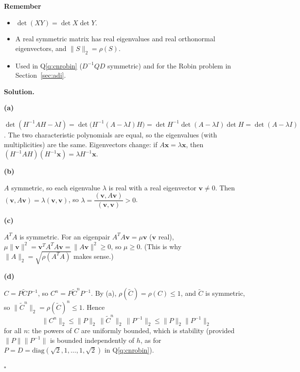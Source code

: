\documentclass[11pt,a4paper]{article}
\newenvironment{rem}
  {\begin{remember}\noindent\textbf{Remember}\par\nobreak\vspace{-0.3em}}
  {\end{remember}}
\newenvironment{solution}
  {\par\noindent\textbf{Solution.}\par\nobreak}
  {\par\nobreak\noindent\hfill\(\square\)\par}
\newcommand{\step}[1]{\par\addvspace{0.5em}\noindent\textbf{#1}\par\nobreak}
\begin{document}
\begin{rem}
\begin{itemize}
  \item \(\det(XY)=\det X\det Y\).
  \item A real symmetric matrix has real eigenvalues and real
    orthonormal eigenvectors, and \(\|S\|_2=\rho(S)\).
  \item Used in Q\ref{q:cnrobin} (\(D^{-1}QD\) symmetric) and for the
    Robin problem in Section~\ref{sec:adi}.
\end{itemize}
\end{rem}

\begin{solution}
\step{(a)}
\(\det(H^{-1}AH-\lambda I)=\det\bigl(H^{-1}(A-\lambda I)H\bigr)
=\det H^{-1}\det(A-\lambda I)\det H=\det(A-\lambda I)\).  The two
characteristic polynomials are equal, so the eigenvalues (with
multiplicities) are the same.  Eigenvectors change: if
\(A\mathbf x=\lambda\mathbf x\), then
\((H^{-1}AH)(H^{-1}\mathbf x)=\lambda H^{-1}\mathbf x\).

\step{(b)}
\(A\) symmetric, so each eigenvalue \(\lambda\) is real with a real
eigenvector \(\mathbf v\ne0\).  Then
\((\mathbf v,A\mathbf v)=\lambda(\mathbf v,\mathbf v)\), so
\(\lambda=\dfrac{(\mathbf v,A\mathbf v)}{(\mathbf v,\mathbf v)}>0\).

\step{(c)}
\(A^TA\) is symmetric.  For an eigenpair
\(A^TA\mathbf v=\mu\mathbf v\) (\(\mathbf v\) real),
\(\mu\|\mathbf v\|^2=\mathbf v^TA^TA\mathbf v=\|A\mathbf v\|^2\ge0\), so
\(\mu\ge0\).  (This is why \(\|A\|_2=\sqrt{\rho(A^TA)}\) makes sense.)

\step{(d)}
\(C=P\widetilde CP^{-1}\), so \(C^n=P\widetilde C^nP^{-1}\).  By (a),
\(\rho(\widetilde C)=\rho(C)\le1\), and \(\widetilde C\) is symmetric, so
\(\|\widetilde C^n\|_2=\rho(\widetilde C)^n\le1\).  Hence
\[
  \|C^n\|_2\le\|P\|_2\,\|\widetilde C^n\|_2\,\|P^{-1}\|_2\le\|P\|_2\|P^{-1}\|_2
\]
for all \(n\): the powers of \(C\) are uniformly bounded, which is
stability (provided \(\|P\|\|P^{-1}\|\) is bounded independently of
\(h\), as for \(P=D=\mathrm{diag}(\sqrt2,1,\dots,1,\sqrt2)\) in
Q\ref{q:cnrobin}).
\end{solution}
\end{document}
